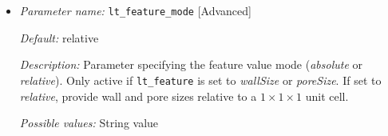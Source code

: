 \begin{itemize}[itemsep=0.8em, parsep=0.3em]
	{\it Possible values:} Non-negative floating point number
	
	\item {\it Parameter name:} {\tt lt\_feature\_mode} \hfill [Advanced]
	\label{parameters:lt_feature_mode}
	
	
	{\it Default:} relative
	
	{\it Description:} Parameter specifying the feature value mode ({\it absolute} or {\it relative}). Only active if {\tt lt\_feature} is set to {\it wallSize} or {\it poreSize}. If set to {\it relative}, provide wall and pore sizes relative to a $1 \times 1 \times 1$ unit cell.
	
	{\it Possible values:} String value
\end{itemize}

